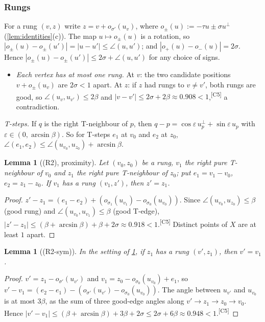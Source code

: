\documentclass[11pt]{amsart}
\newtheorem{lemma}[theorem]{Lemma}
\theoremstyle{definition}
\theoremstyle{remark}
\newcommand{\eps}{\varepsilon}
\newcommand{\chk}[1]{\textsuperscript{[#1]}}
\begin{document}
\subsubsection{Rungs}
For a rung $(v,z)$ write $z=v+o_{\sigma'}(u_v)$, where $o_{\pm}(u):=-\tau u\pm\sigma u^\perp$ (\cref{lem:identities}(c)). The map $u\mapsto o_\pm(u)$ is a rotation, so $|o_\pm(u)-o_\pm(u')|=|u-u'|\le\angle(u,u')$; and $|o_+(u)-o_-(u)|=2\sigma$. Hence $|o_{\pm}(u)-o_{\pm}(u')|\le2\sigma+\angle(u,u')$ for any choice of signs.

\begin{itemize}[leftmargin=2em]
\item[(R1)] \emph{Each vertex has at most one rung.} At $v$: the two candidate positions $v+o_\pm(u_v)$ are $2\sigma<1$ apart. At $z$: if $z$ had rungs to $v\neq v'$, both rungs are good, so $\angle(u_v,u_{v'})\le2\beta$ and $|v-v'|\le2\sigma+2\beta\approx0.908<1$,\chk{C5} a contradiction.
\end{itemize}

\emph{T-steps.} If $q$ is the right T-neighbour of $p$, then $q-p=\cos\eps\,u_p^\perp+\sin\eps\,u_p$ with $\eps\in(0,\arcsin\beta)$. So for T-steps $e_1$ at $v_0$ and $e_2$ at $z_0$, $\angle(e_1,e_2)\le\angle(u_{v_0},u_{z_0})+\arcsin\beta$.

\begin{lemma}[(R2), proximity]\label{lem:R2}
Let $(v_0,z_0)$ be a rung, $v_1$ the right pure T-neighbour of $v_0$ and $z_1$ the right pure T-neighbour of $z_0$; put $e_1=v_1-v_0$, $e_2=z_1-z_0$. If $v_1$ has a rung $(v_1,z')$, then $z'=z_1$.
\end{lemma}
\begin{proof}
$z'-z_1=(e_1-e_2)+(o_{\sigma_1}(u_{v_1})-o_{\sigma_0}(u_{v_0}))$. Since $\angle(u_{v_0},u_{z_0})\le\beta$ (good rung) and $\angle(u_{v_0},u_{v_1})\le\beta$ (good T-edge), $|z'-z_1|\le(\beta+\arcsin\beta)+\beta+2\sigma\approx0.918<1$.\chk{C5} Distinct points of $X$ are at least $1$ apart.
\end{proof}

\begin{lemma}[(R2-sym)]\label{lem:R2sym}
In the setting of \cref{lem:R2}, if $z_1$ has a rung $(v',z_1)$, then $v'=v_1$.
\end{lemma}
\begin{proof}
$v'=z_1-o_{\sigma'}(u_{v'})$ and $v_1=z_0-o_{\sigma_0}(u_{v_0})+e_1$, so $v'-v_1=(e_2-e_1)-(o_{\sigma'}(u_{v'})-o_{\sigma_0}(u_{v_0}))$. The angle between $u_{v'}$ and $u_{v_0}$ is at most $3\beta$, as the sum of three good-edge angles along $v'\to z_1\to z_0\to v_0$. Hence $|v'-v_1|\le(\beta+\arcsin\beta)+3\beta+2\sigma\le2\sigma+6\beta\approx0.948<1$.\chk{C5}
\end{proof}
\end{document}
